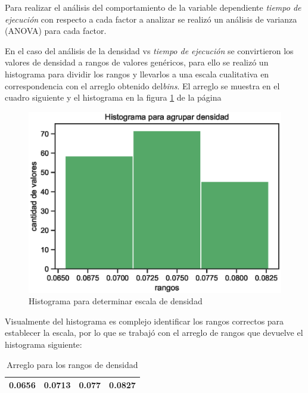 \documentclass{article}
\begin{document}
Para realizar el análisis del comportamiento de la variable dependiente \textit{tiempo de ejecución} con respecto a cada factor a analizar se realizó un análisis de varianza (ANOVA) para cada factor.

En el caso del análisis de la densidad vs \textit{tiempo de ejecución} se convirtieron los valores de densidad  a rangos de valores genéricos, para ello se realizó un histograma para dividir los rangos y llevarlos a una escala cualitativa en correspondencia con el arreglo obtenido del\textit{bins}. El arreglo se muestra en el cuadro siguiente y el histograma en la figura \ref{fig:Fig1} de la página \pageref{fig:Fig1}

\begin{figure}[htbp]
    \centering
    \includegraphics[scale=0.6]{Imagenes/Histogramadensidad.eps}
    \caption{Histograma para determinar escala de densidad}
    \label{fig:Fig1}
\end{figure}

Visualmente del histograma es complejo identificar los rangos correctos para establecer la escala, por lo que se trabajó con el arreglo de rangos que devuelve el histograma siguiente:

\begin{table}[htbp]
  \centering
  \caption{Arreglo para los rangos de densidad}
    \begin{tabular}{cccc}
    \toprule
    0.0656 & 0.0713 & 0.077 & 0.0827 \\
    \bottomrule
    \end{tabular}%
  \label{tab:addlabel}%
\end{table}%
\end{document}
